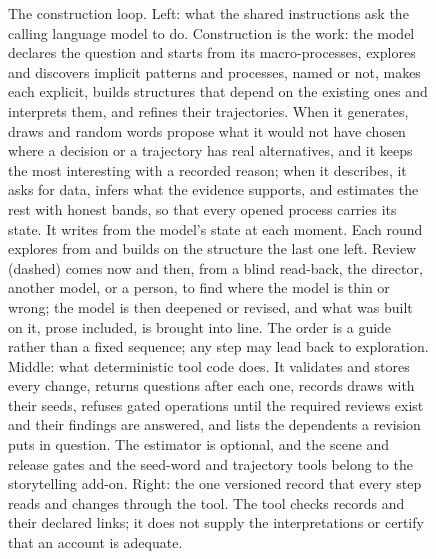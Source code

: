 \begin{figure}[!htbp]
\caption{The construction loop. Left: what the shared instructions ask the
calling language model to do. Construction is the work: the model declares the
question and starts from its macro-processes, explores and discovers implicit
patterns and processes, named or not, makes each explicit, builds structures
that depend on the existing ones and interprets them, and refines their
trajectories. When it generates, draws and random words propose what it would
not have chosen where a decision or a trajectory has real alternatives, and it
keeps the most interesting with a recorded reason; when it describes, it asks
for data, infers what the evidence supports, and estimates the rest with honest
bands, so that every opened process carries its state. It writes from the model's
state at each moment. Each round explores from and builds on the structure the
last one left. Review (dashed) comes now and then, from a blind read-back, the
director, another model, or a person, to find where the model is thin or
wrong; the model is then deepened or revised, and what was built on it, prose
included, is brought into line. The order is a guide rather than a fixed
sequence; any step may lead back to exploration. Middle: what deterministic
tool code does. It validates and stores every change, returns questions after
each one, records draws with their seeds, refuses gated operations until the
required reviews exist and their findings are answered, and lists the
dependents a revision puts in question. The estimator is optional, and the
scene and release gates and the seed-word and trajectory tools belong to the
storytelling add-on. Right: the one versioned record that every step reads and
changes through the tool. The tool checks records and their declared links; it
does not supply the interpretations or certify that an account is adequate.}
\label{fig:construction-loop}
\end{figure}

